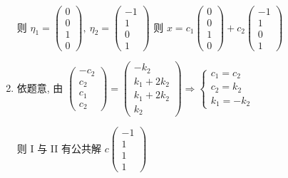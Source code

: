 \begin{enumerate}
                   则 $ \eta_{1} = \begin{pmatrix}
                           0 \\
                           0 \\
                           1 \\
                           0
                       \end{pmatrix} ,\ \eta_{2} = \begin{pmatrix}
                           -1 \\
                           1  \\
                           0  \\
                           1
                       \end{pmatrix} $ 则 $ x = c_{1}\begin{pmatrix}
                           0 \\
                           0 \\
                           1 \\
                           0
                       \end{pmatrix} + c_{2}\begin{pmatrix}
                           -1 \\
                           1  \\
                           0  \\
                           1
                       \end{pmatrix} $
             \item %
                   依题意, 由 \( \begin{pmatrix}
                       -c_{2} \\
                       c_{2}  \\
                       c_{1}  \\
                       c_{2}
                   \end{pmatrix} = \begin{pmatrix}
                       -k_{2}       \\
                       k_{1}+2k_{2} \\
                       k_{1}+2k_{2} \\
                       k_{2}
                   \end{pmatrix} \Rightarrow \begin{cases}
                       c_{1} = c_{2} \\
                       c_{2} = k_{2} \\
                       k_{1} = -k_{2}
                   \end{cases}\)

                   则 I 与 II 有公共解 $c\begin{pmatrix}
                           -1 \\
                           1  \\
                           1  \\
                           1
                       \end{pmatrix}$
         \end{enumerate}



